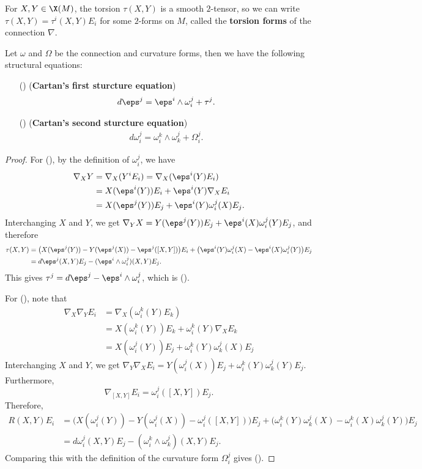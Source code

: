For $X,Y\in\X(M)$, the torsion $\tau(X,Y)$ is a smooth $2$-tensor, so we can write $\tau(X,Y)=\tau^i(X,Y)E_i$ for some $2$-forms on $M$, called the \textbf{torsion forms} of the 
connection $\nabla$.
\begin{proposition}
Let $\omega$ and $\Omega$ be the connection and curvature forms, then we have the following structural equations:
\begin{itemize}
\item[(\rmnum{1})] (\textbf{Cartan's first sturcture equation})
\begin{align}\label{Riemann sturcture equation-1}
d\eps^j=\eps^i\wedge\omega_i^j+\tau^j.
\end{align}
\item[(\rmnum{2})] (\textbf{Cartan's second sturcture equation})
\begin{align}\label{Riemann sturcture equation-2}
d\omega_i^j=\omega_i^k\wedge\omega_k^j+\Omega_i^j.
\end{align}
\end{itemize}
\end{proposition}
\begin{proof}
For (), by the definition of $\omega_i^j$, we have
\begin{align*}
\nabla_XY&=\nabla_X(Y^iE_i)=\nabla_X(\eps^i(Y)E_i)\\
&=X(\eps^i(Y))E_i+\eps^i(Y)\nabla_XE_i\\
&=X(\eps^j(Y))E_j+\eps^i(Y)\omega_i^j(X)E_j.
\end{align*}
Interchanging $X$ and $Y$, we get $\nabla_YX=Y(\eps^j(Y))E_j+\eps^i(X)\omega_i^j(Y)E_j$, and therefore 
\begin{align*}
\tau(X,Y)&=\big(X(\eps^j(Y))-Y(\eps^j(X))-\eps^j([X,Y])\big)E_i+\big(\eps^i(Y)\omega_i^j(X)-\eps^i(X)\omega_i^j(Y)\big)E_j\\
&=d\eps^j(X,Y)E_j-(\eps^i\wedge\omega_i^j)(X,Y)E_j.
\end{align*}
This gives $\tau^j=d\eps^j-\eps^i\wedge\omega_i^j$, which is ().\par
For (), note that
\begin{align*}
\nabla_X\nabla_YE_i&=\nabla_X(\omega_i^k(Y)E_k)\\
&=X(\omega_i^k(Y))E_k+\omega_i^k(Y)\nabla_XE_k\\
&=X(\omega_i^j(Y))E_j+\omega_i^k(Y)\omega_k^j(X)E_j
\end{align*}
Interchanging $X$ and $Y$, we get $\nabla_Y\nabla_XE_i=Y(\omega_i^j(X))E_j+\omega_i^k(Y)\omega_k^j(Y)E_j$. Furthermore,
\[\nabla_{[X,Y]}E_i=\omega_i^j([X,Y])E_j.\]
Therefore,
\begin{align*}
R(X,Y)E_i&=\big(X(\omega_i^j(Y))-Y(\omega_i^j(X))-\omega_i^j([X,Y])\big)E_j+\big(\omega_i^k(Y)\omega_k^j(X)-\omega_i^k(X)\omega_k^j(Y)\big)E_j\\
&=d\omega_i^j(X,Y)E_j-(\omega_i^k\wedge\omega_k^j)(X,Y)E_j.
\end{align*}
Comparing this with the definition of the curvature form $\Omega_i^j$ gives ().
\end{proof}
